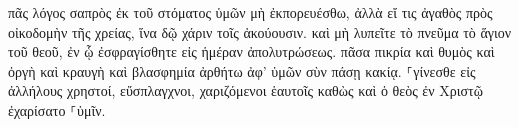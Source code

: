 \documentclass{openreader}
\begin{document}
πᾶς λόγος σαπρὸς ἐκ τοῦ στόματος ὑμῶν μὴ ἐκπορευέσθω, ἀλλὰ εἴ τις ἀγαθὸς πρὸς οἰκοδομὴν τῆς χρείας, ἵνα δῷ χάριν τοῖς ἀκούουσιν. 
καὶ μὴ λυπεῖτε τὸ πνεῦμα τὸ ἅγιον τοῦ θεοῦ, ἐν ᾧ ἐσφραγίσθητε εἰς ἡμέραν ἀπολυτρώσεως. 
πᾶσα πικρία καὶ θυμὸς καὶ ὀργὴ καὶ κραυγὴ καὶ βλασφημία ἀρθήτω ἀφ’ ὑμῶν σὺν πάσῃ κακίᾳ. 
⸀γίνεσθε εἰς ἀλλήλους χρηστοί, εὔσπλαγχνοι, χαριζόμενοι ἑαυτοῖς καθὼς καὶ ὁ θεὸς ἐν Χριστῷ ἐχαρίσατο ⸀ὑμῖν. 
\end{document}
